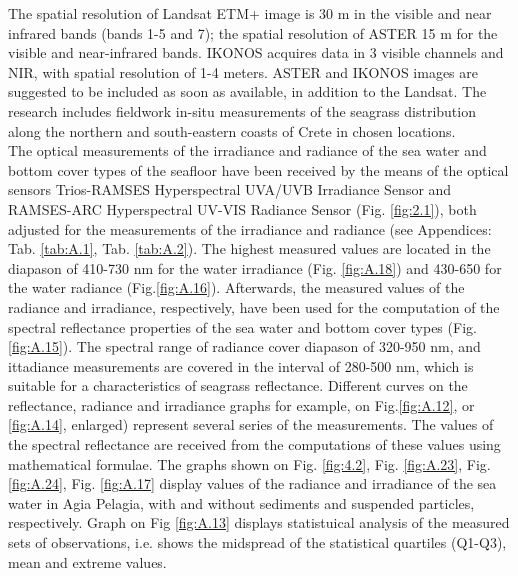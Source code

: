 \documentclass[10pt, a4paper]{article}
\begin{document}
The spatial resolution of Landsat ETM+ image is 30 m in the visible and near infrared bands (bands
1-5 and 7); the spatial resolution of ASTER 15 m for the visible and near-infrared bands. IKONOS
acquires data in 3 visible channels and NIR, with spatial resolution of 1-4 meters. ASTER and
IKONOS images are suggested to be included as soon as available, in addition to the Landsat. The
research includes fieldwork in-situ measurements of the seagrass distribution along the northern and
south-eastern coasts of Crete in chosen locations.\\
The optical measurements of the irradiance and radiance of the sea water and bottom cover types of
the seafloor have been received by the means of the optical sensors Trios-RAMSES Hyperspectral
UVA/UVB Irradiance Sensor and RAMSES-ARC Hyperspectral UV-VIS Radiance Sensor (Fig. \ref{fig:2.1}), both adjusted for the measurements of the irradiance and radiance (see Appendices: Tab. \ref{tab:A.1}, Tab. \ref{tab:A.2}).
The highest measured values are located in the diapason of 410-730 nm for the water irradiance (Fig. \ref{fig:A.18}) and 430-650 for the water radiance (Fig.\ref{fig:A.16}). 
Afterwards, the measured values of the
radiance and irradiance, respectively, have been used for the computation of the spectral reflectance
properties of the sea water and bottom cover types (Fig.\ref{fig:A.15}). The spectral range of radiance
cover diapason of 320-950 nm, and ittadiance measurements are covered in the interval of 280-500
nm, which is suitable for a characteristics of seagrass reflectance.
Different curves on the reflectance, radiance and irradiance graphs for example, on Fig.\ref{fig:A.12}, or \ref{fig:A.14}, enlarged) represent several series of
the measurements. The values of the spectral reflectance are received from the
computations of these values using mathematical formulae. The graphs shown on Fig. \ref{fig:4.2}, Fig. \ref{fig:A.23}, Fig. \ref{fig:A.24}, Fig. \ref{fig:A.17} display values of the radiance and irradiance of the sea water in Agia Pelagia, with and without sediments and suspended particles, respectively. Graph on Fig \ref{fig:A.13} displays statistuical analysis of the measured sets of observations, i.e. shows the midspread of the statistical quartiles (Q1-Q3), mean and extreme values.
\end{document}
